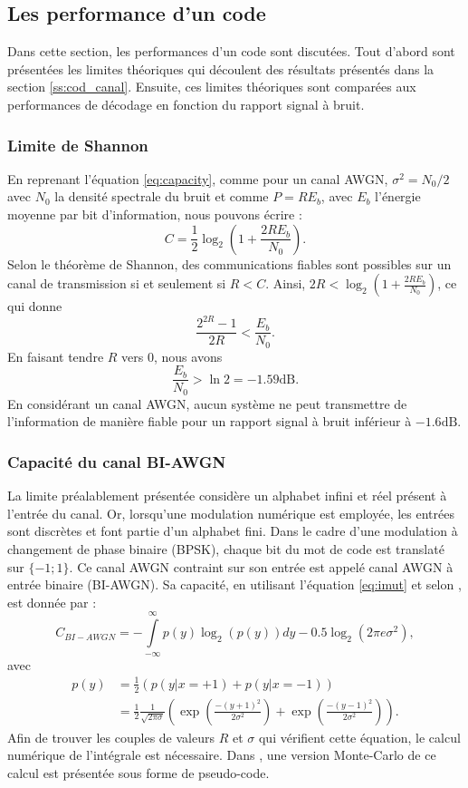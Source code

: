 \subsection{Les performance d'un code}
Dans cette section, les performances d'un code sont discutées. Tout d'abord sont présentées les limites théoriques qui 
découlent des résultats présentés dans la section \ref{ss:cod_canal}. Ensuite, ces limites théoriques sont comparées aux 
performances de décodage en fonction du rapport signal à bruit.
\subsubsection{Limite de Shannon}
En reprenant l'équation \ref{eq:capacity}, comme pour un canal AWGN, $\sigma^2 = N_0/2$ avec $N_0$ la densité spectrale du bruit et comme 
$P=R E_b$, avec $E_b$ l'énergie moyenne par bit d'information, nous pouvons écrire :
\[C=\frac{1}{2}\log_2(1+\frac{2RE_b}{N_0}).\]
Selon le théorème de Shannon, des communications fiables sont possibles sur un canal de transmission si et seulement si $R < C$. Ainsi,
$2R < \log_2\left(1+\frac{2RE_b}{N_0}\right)$, ce qui donne 
\begin{equation}\label{eq:shlimit}
	\frac{2^{2R}-1}{2R}<\frac{E_b}{N_0}.
\end{equation}
En faisant tendre $R$ vers $0$, nous avons \[\frac{E_b}{N_0}>\ln 2 = -1.59 \text{dB}.\]
En considérant un canal AWGN, aucun système ne peut transmettre de l'information de manière fiable pour un rapport 
signal à bruit inférieur à $-1.6\text{dB}.$

\subsubsection{Capacité du canal BI-AWGN}
La limite préalablement présentée considère un alphabet infini et réel présent à l'entrée du canal. Or, lorsqu'une 
modulation numérique est employée, les entrées sont discrètes et font partie d'un alphabet fini. Dans le cadre d'une 
modulation à changement de phase binaire (BPSK), chaque bit du mot de code est translaté sur $\{-1;1\}$. Ce canal AWGN 
contraint sur son entrée est appelé canal AWGN à entrée binaire (BI-AWGN). Sa capacité, en utilisant l'équation 
\ref{eq:imut} et selon \cite[Chapitre 8]{ryan}, est donnée par : 
\begin{equation}\label{eq:softlimit}
	C_{BI-AWGN} = - \int\limits_{-\infty}^{\infty} p(y) \log_2\left(p(y)\right)dy - 0.5\log_2\left(2\pi e \sigma^2\right),
\end{equation}
avec 
\begin{align*}
	p(y) & = \frac{1}{2} \left(p(y|x=+1)+p(y|x=-1)\right)                                                    \\
	     & = \frac{1}{2} \frac{1}{\sqrt{2\pi \sigma}} \left( \exp \left(\frac{-(y+1)^2}{2\sigma ^2}\right) + 
	\exp \left(\frac{-(y-1)^2}{2\sigma ^2}\right)\right).
\end{align*}
Afin de trouver les couples de valeurs $R$ et $\sigma$ qui vérifient cette équation, le calcul numérique de l'intégrale 
est nécessaire. Dans \cite{johnson2009iterative}, une version Monte-Carlo de ce calcul est présentée sous forme de pseudo-code.

